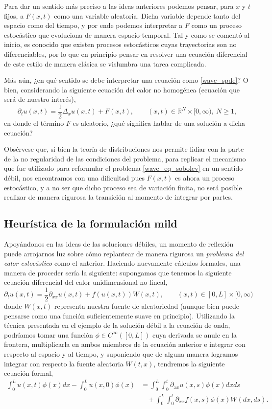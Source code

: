 \documentclass[letterpaper,twoside,12pt]{book}
\newcommand{\R}{\mathbb{R}}
\newcommand{\1}{\mathds{1}}
\theoremstyle{definition}
\theoremstyle{definition}
\theoremstyle{remark}
\theoremstyle{definition}
\theoremstyle{definition}
\theoremstyle{definition}
\theoremstyle{definition}
\theoremstyle{definition}
\begin{document}
Para dar un sentido más preciso a las ideas anteriores podemos pensar, para $x$ y $t$ fijos, a $F(x,t)$ como una variable aleatoria. Dicha variable depende tanto del espacio como del tiempo, y por ende podemos interpretar a $F$ como un proceso estocástico que evoluciona de manera espacio-temporal. Tal y como se comentó al inicio, es conocido que existen procesos estocásticos cuyas trayectorias son no diferenciables, por lo que en principio pensar en resolver una ecuación diferencial de este estilo de manera clásica se vislumbra una tarea complicada.

Más aún, ¿en qué sentido se debe interpretar una ecuación como \eqref{wave_spde}? O bien, considerando la siguiente ecuación del calor no homogénea (ecuación que será de nuestro interés),  
\begin{equation}\label{heat_spde}
    \partial_t{u(x,t)}=\frac{1}{2}\Delta_{x}u(x,t)+F(x,t), \qquad (x,t)\in \R^{N}\times[0,\infty), \ N\geq1,
\end{equation}
en donde el término $F$ es aleatorio, ¿qué significa hablar de una solución a dicha ecuación?

Obsérvese que, si bien la teoría de distribuciones nos permite lidiar con la parte de la no regularidad de las condiciones del problema, para replicar el mecanismo que fue utilizado para reformular el problema \eqref{wave_eq_sobolev} en un sentido débil, nos encontramos con una dificultad pues $F(x,t)$ es ahora un proceso estocástico, y a no ser que dicho proceso sea de variación finita, no será posible realizar de manera rigurosa la transición al momento de integrar por partes.

\subsection{Heurística de la formulación mild}

Apoyándonos en las ideas de las soluciones débiles, un momento de reflexión puede arrojarnos luz sobre cómo replantear de manera rigurosa un \textit{problema del calor estocástico} como el anterior. Haciendo nuevamente cálculos formales, una manera de proceder sería la siguiente: supongamos que tenemos la siguiente ecuación diferencial del calor unidimensional no lineal,
\[
\partial_tu(x,t)=\frac{1}{2}\partial_{xx}u(x,t)+f(u(x,t))W(x,t), \qquad (x,t)\in [0,L]\times [0,\infty) 
\]
donde $W(x,t)$ representa nuestra fuente de aleatoriedad (aunque bien puede pensarse como una función suficientemente suave en principio). Utilizando la técnica presentada en el ejemplo de la solución débil a la ecuación de onda, podríamos tomar una función $\phi \in C^{\infty}([0,L])$ cuya derivada se anule en la frontera, multiplicarla en ambos miembros de la ecuación anterior e integrar con respecto al espacio y al tiempo, y suponiendo que de alguna manera logramos integrar con respecto la fuente aleatoria $W(t,x)$, tendremos la siguiente ecuación formal, 
\begin{align*}
   \int_{0}^{L}u(x,t)\phi(x)dx-\int_{0}^{L}u(x,0)\phi(x)&=\int_{0}^{L}\int_{0}^{t}\partial_{xx}u(x,s)\phi(x)dx ds\\
   &\ \ \ \ +\int_{0}^{L}\int_{0}^{t}\partial_{xx}f(x,s)\phi(x)W(dx,ds).
\end{align*}
\end{document}
